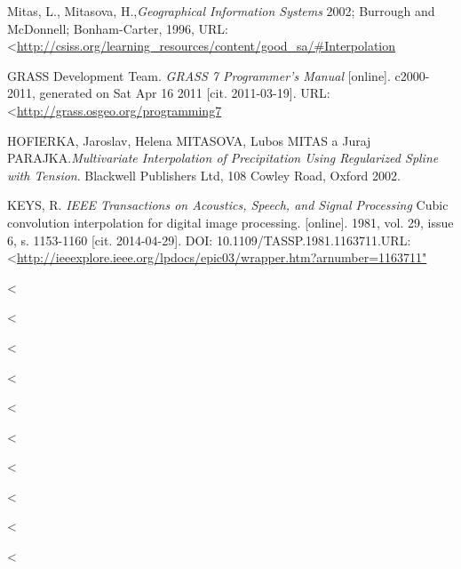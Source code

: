 \documentclass[a4paper,12pt,oneside]{report}
\begin{document}
\begin{thebibliography}{99}
Mitas, L., Mitasova, H.,\textit{Geographical Information Systems}
2002; Burrough and McDonnell; Bonham-Carter, 1996, URL: \textless\url {http://csiss.org/learning_resources/content/good_sa/#Interpolation}


GRASS Development Team.\textit{ GRASS 7 Programmer’s Manual}
[online]. c2000-2011, generated on Sat Apr 16 2011 [cit. 2011-03-19]. URL:\textless\url {http://grass.osgeo.org/programming7  }

HOFIERKA, Jaroslav, Helena  MITASOVA, Lubos MITAS a Juraj PARAJKA.\textit{Multivariate Interpolation of Precipitation Using Regularized Spline with Tension}. Blackwell Publishers Ltd, 108 Cowley Road, Oxford 2002. 

KEYS, R. \textit{ IEEE Transactions on Acoustics, Speech, and Signal Processing}
Cubic convolution interpolation for digital image processing. [online]. 1981, vol. 29, issue 6, s. 1153-1160 [cit. 2014-04-29]. DOI: 10.1109/TASSP.1981.1163711.URL:\textless\url {http://ieeexplore.ieee.org/lpdocs/epic03/wrapper.htm?arnumber=1163711"}




\textless\url {  }

\bibitem{ }
\textit{ }
\textless\url {  }

\bibitem{ }
\textit{ }
\textless\url {  }

\bibitem{ }
\textit{ }
\textless\url {  }

\bibitem{ }
\textit{ }
\textless\url {  }

\bibitem{ }
\textit{ }
\textless\url {  }

\bibitem{ }
\textit{ }
\textless\url {  }

\bibitem{ }
\textit{ }
\textless\url {  }

\bibitem{ }
\textit{ }
\textless\url {  }


\bibitem{ }
\textit{ }
\textless\url {  }





\end{thebibliography}
\end{document}
